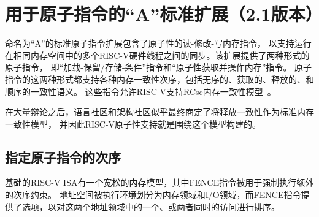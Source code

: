 \chapter{用于原子指令的“A”标准扩展（2.1版本）}
\label{atomics}

命名为“A”的标准原子指令扩展包含了原子性的读-修改-写内存指令，
以支持运行在相同内存空间中的多个RISC-V硬件线程之间的同步。该扩展提供了两种形式的原子指令，
即“加载-保留/存储-条件”指令和“原子性获取并操作内存”指令。
原子指令的这两种形式都支持各种内存一致性次序，包括无序的、获取的、释放的、和顺序的一致性语义。
这些指令允许RISC-V支持RCsc内存一致性模型~\cite{Gharachorloo90memoryconsistency}。

\begin{commentary}

  在大量辩论之后，语言社区和架构社区似乎最终商定了将释放一致性作为标准内存一致性模型，
  并因此RISC-V原子性支持就是围绕这个模型构建的。
\end{commentary}

\section{指定原子指令的次序}

基础的RISC-V ISA有一个宽松的内存模型，其中FENCE指令被用于强制执行额外的次序约束。
地址空间被执行环境划分为内存领域和I/O领域，而FENCE指令提供了选项，以对这两个地址领域中的一个、或两者同时的访问进行排序。

